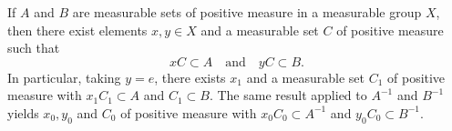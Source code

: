 If $A$ and $B$ are measurable sets of positive measure in a measurable group $X$, then there exist elements $x, y \in X$ and a measurable set $C$ of positive measure such that
$$xC \subset A \quad \text{and} \quad yC \subset B.$$
In particular, taking $y = e$, there exists $x_1$ and a measurable set $C_1$ of positive measure with $x_1 C_1 \subset A$ and $C_1 \subset B$. The same result applied to $A^{-1}$ and $B^{-1}$ yields $x_0, y_0$ and $C_0$ of positive measure with $x_0 C_0 \subset A^{-1}$ and $y_0 C_0 \subset B^{-1}$.
